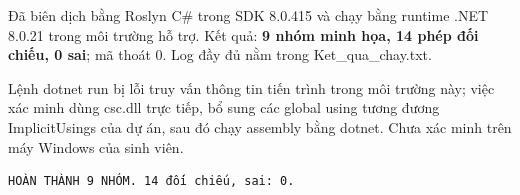 Đã biên dịch bằng Roslyn C\# trong SDK 8.0.415 và chạy bằng runtime .NET 8.0.21 trong môi trường hỗ trợ. Kết quả: \textbf{9 nhóm minh họa, 14 phép đối chiếu, 0 sai}; mã thoát 0. Log đầy đủ nằm trong Ket\_qua\_chay.txt.

Lệnh dotnet run bị lỗi truy vấn thông tin tiến trình trong môi trường này; việc xác minh dùng csc.dll trực tiếp, bổ sung các global using tương đương ImplicitUsings của dự án, sau đó chạy assembly bằng dotnet. Chưa xác minh trên máy Windows của sinh viên.
\begin{Verbatim}[fontsize=\small]
HOÀN THÀNH 9 NHÓM. 14 đối chiếu, sai: 0.
\end{Verbatim}
